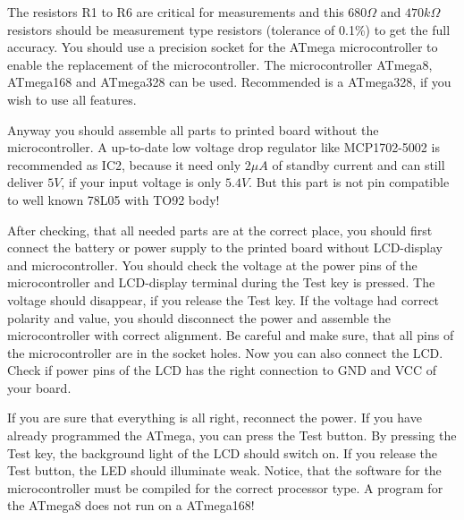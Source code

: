 The resistors R1 to R6 are critical for measurements and this \(680\Omega\) and
\(470k\Omega\) resistors should be measurement type resistors (tolerance of 0.1\%) to
get the full accuracy.
You should use a precision socket for the ATmega microcontroller to enable
the replacement of the microcontroller.
The microcontroller ATmega8, ATmega168 and ATmega328 can be used.
Recommended is a ATmega328, if you wish to use all features.

Anyway you should assemble all parts to printed board without the microcontroller.
A up-to-date low voltage drop regulator like MCP1702-5002 is recommended as IC2, because it
need only \(2\mu A\) of standby current and can still deliver \(5V\), if your input
voltage is only \(5.4V\). But this part is not pin compatible to well known 78L05 with TO92 body!

After checking, that all needed parts are at the correct place, you should
first connect the battery or power supply to the printed board without LCD-display
and microcontroller. You should check the voltage at the power pins of the
microcontroller and LCD-display terminal during the Test key is pressed.
The voltage should disappear, if you release the Test key.
If the voltage had correct polarity and value,
you should disconnect the power and assemble the microcontroller with correct
alignment. Be careful and make sure, that all pins of the microcontroller
are in the socket holes.
Now you can also connect the LCD. Check if power pins of the LCD has the right connection to
GND and VCC of your board.

If you are sure that everything is all right, reconnect the power. 
If you have already programmed the ATmega, you can press the Test button.
By pressing the Test key, the background light of the LCD should switch on.
If you release the Test button, the LED should illuminate weak.
Notice, that the software for the microcontroller must be compiled for the
correct processor type. A program for the ATmega8 does not run on a ATmega168!

